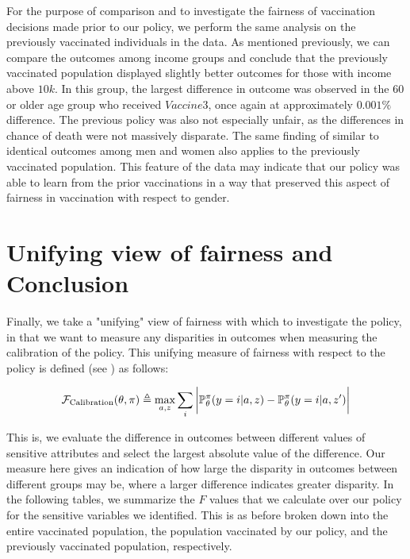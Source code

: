 \documentclass{article}
\begin{document}
For the purpose of comparison and to investigate the fairness of vaccination decisions made prior to our policy, we perform the same analysis on the previously vaccinated individuals in the data. As mentioned previously, we can compare the outcomes among income groups and conclude that the previously vaccinated population displayed slightly better outcomes for those with income above $10k$. In this group, the largest difference in outcome was observed in the $60$ or older age group who received $Vaccine3$, once again at approximately $0.001\%$ difference. The previous policy was also not especially unfair, as the differences in chance of death were not massively disparate. The same finding of similar to identical outcomes among men and women also applies to the previously vaccinated population. This feature of the data may indicate that our policy was able to learn from the prior vaccinations in a way that preserved this aspect of fairness in vaccination with respect to gender.

\section{Unifying view of fairness and Conclusion}
\label{sec: Conclusion}

Finally, we take a "unifying" view of fairness with which to investigate the policy, in that we want to measure any disparities in outcomes when measuring the calibration of the policy. This unifying measure of fairness with respect to the policy is defined (see \textcolor{blue}{\cite{Dimitrakakis}}) as follows:

\begin{equation}
\label{eq: F_calibration}
    \mathcal{F}_{\text{Calibration}}(\theta, \pi) \triangleq \max_{a, z} \sum_{i} \bigg{|}\mathbb{P}_{\theta}^{\pi}(y=i|a,z) - \mathbb{P}_{\theta}^{\pi}(y=i|a,z^{\prime})\bigg{|}
\end{equation}

This is, we evaluate the difference in outcomes between different values of sensitive attributes and select the largest absolute value of the difference. Our measure here gives an indication of how large the disparity in outcomes between different groups may be, where a larger difference indicates greater disparity. In the following tables, we summarize the $F$ values that we calculate over our policy for the sensitive variables we identified. This is as before broken down into the entire vaccinated population, the population vaccinated by our policy, and the previously vaccinated population, respectively.
\end{document}
